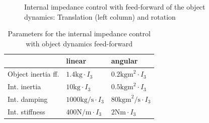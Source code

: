 \documentclass[a4paper,twoside, openright,12pt]{report}
\begin{document}
{%
%
\begin{figure}[h]

\label{FIG:DePaSim}
\caption[Simulation results: Internal impedance control with feed-forward of the object dynamics]{Internal impedance control with feed-forward of the object dynamics: Translation (left column) and rotation}
\end{figure}

\begin{table}
	\centering
	\caption[Parameters for the internal impedance control with object dynamics feed-forward]{Parameters for the internal impedance control with object dynamics feed-forward}\vspace{10pt}
	\label{TAB:DePaParameters}
	
	\begin{tabular}{ l | l | l }
	 & linear & angular \\ \hline
	Object inertia ff. & $1.4 \text{kg} \cdot I_3$ & $0.2 \text{kgm}^2 \cdot I_3$ \\ \hline
	Int. inertia & $10 \text{kg} \cdot I_3$ & $0.5 \text{kgm}^2 \cdot I_3$ \\ \hline
	Int. damping & $1000 \text{kg/s} \cdot I_3$ & $80 \text{kgm}^2 \text{/s} \cdot I_3 $ \\ \hline
	Int. stiffness & $400 \text{N/m} \cdot I_3$ & $2 \text{Nm} \cdot I_3$\\ \hline
\end{tabular}
\end{table}


}
\end{document}
